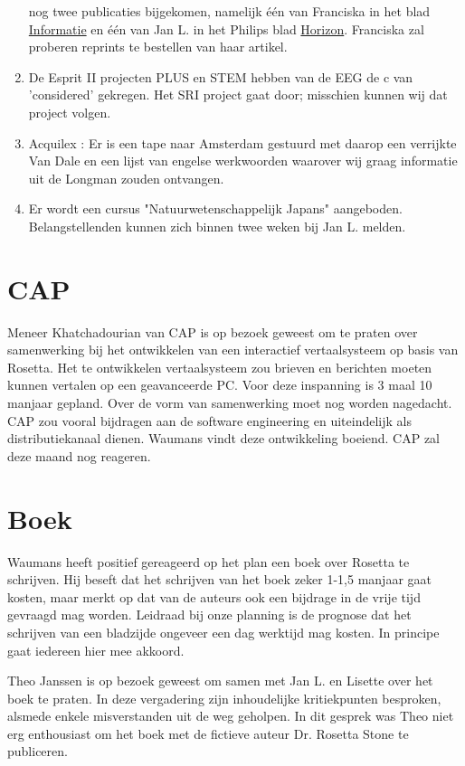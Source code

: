 \begin{enumerate}
nog twee publicaties bijgekomen, namelijk \'{e}\'{e}n 
         van Franciska in het blad \underline{Informatie} en \'{e}\'{e}n van 
Jan L. in het Philips blad \underline{Horizon}. Franciska zal proberen 
reprints te bestellen van haar artikel.
   \item De Esprit II projecten PLUS en STEM hebben van de EEG de c van 
         'considered' gekregen. Het SRI project gaat door; misschien kunnen wij 
dat project volgen.
   \item Acquilex : Er is een tape naar
Amsterdam gestuurd met daarop een verrijkte Van Dale en een lijst van engelse 
werkwoorden waarover wij graag informatie uit de Longman zouden ontvangen.   
   \item Er wordt een cursus "Natuurwetenschappelijk Japans" aangeboden. 
Belangstellenden kunnen zich binnen twee weken bij Jan L. melden.
\end{enumerate}

\section {CAP}

Meneer Khatchadourian van CAP is op bezoek geweest om te praten over 
samenwerking bij het ontwikkelen van een interactief vertaalsysteem op basis 
van Rosetta. Het te ontwikkelen vertaalsysteem zou brieven en berichten moeten 
kunnen vertalen op een geavanceerde PC. Voor deze inspanning is 3 maal 10 
manjaar gepland. Over de vorm van samenwerking moet nog worden nagedacht. 
CAP zou vooral bijdragen aan de software engineering en uiteindelijk als 
distributiekanaal dienen. Waumans 
vindt deze ontwikkeling boeiend. CAP zal deze maand nog reageren.

\section {Boek}

Waumans heeft positief gereageerd op het plan een boek over Rosetta te 
schrijven. Hij beseft dat het schrijven van het boek zeker 1-1,5 manjaar 
gaat kosten, maar merkt op dat van de auteurs ook een bijdrage in de vrije tijd 
gevraagd mag worden.
Leidraad bij onze planning is de prognose dat het schrijven van een 
bladzijde ongeveer een dag werktijd mag kosten. In principe gaat iedereen 
hier mee 
akkoord.

Theo Janssen is op bezoek geweest om samen met Jan L. en Lisette over het boek 
te praten. In deze vergadering zijn inhoudelijke kritiekpunten besproken, 
alsmede enkele misverstanden uit de weg geholpen. In dit gesprek was Theo niet 
erg enthousiast
om het boek met de fictieve auteur Dr. Rosetta Stone te publiceren. 

